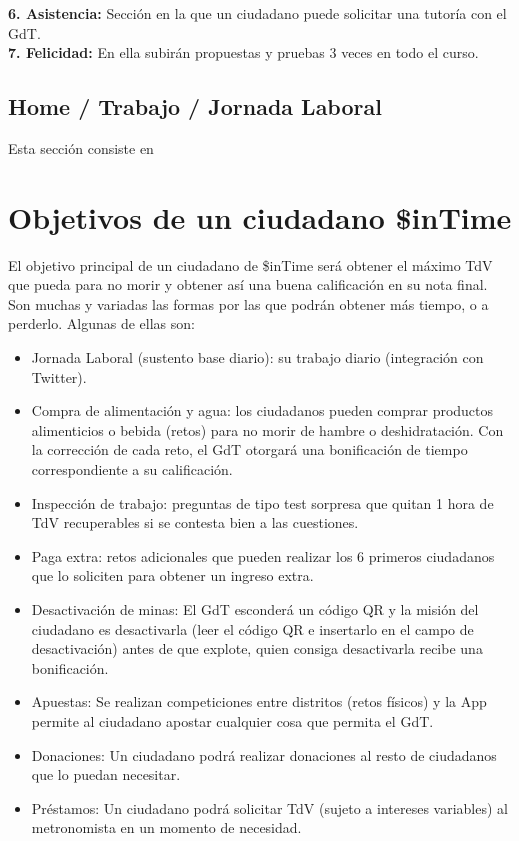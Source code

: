 \noindent
\textbf{6. Asistencia: } Sección en la que un ciudadano puede solicitar una tutoría con el GdT.\\

\noindent
\textbf{7. Felicidad: } En ella subirán propuestas y pruebas 3 veces en todo el curso.

\newpage

\subsection{Home / Trabajo / Jornada Laboral}

Esta sección consiste en 

\newpage
\section{Objetivos de un ciudadano \$inTime}

El objetivo principal de un ciudadano de \$inTime será obtener el máximo TdV que pueda para no morir y obtener así una buena calificación en su nota final. Son muchas y variadas las formas por las que podrán obtener más tiempo, o a perderlo. Algunas de ellas son:

\begin{itemize}
\item Jornada Laboral (sustento base diario): su trabajo diario (integración con Twitter).
\item Compra de alimentación y agua: los ciudadanos pueden comprar productos alimenticios o bebida (retos) para no morir de hambre o deshidratación. Con la corrección de cada reto, el GdT otorgará una bonificación de tiempo correspondiente a su calificación.
\item Inspección de trabajo: preguntas de tipo test sorpresa que quitan 1 hora de TdV recuperables si se contesta bien a las cuestiones.
\item Paga extra: retos adicionales que pueden realizar los 6 primeros ciudadanos que lo soliciten para obtener un ingreso extra.
\item Desactivación de minas: El GdT esconderá un código QR y la misión del ciudadano es desactivarla (leer el código QR e insertarlo en el campo de desactivación) antes de que explote, quien consiga desactivarla recibe una bonificación.
\item Apuestas: Se realizan competiciones entre distritos (retos físicos) y la App permite al ciudadano apostar cualquier cosa que permita el GdT.
\item Donaciones: Un ciudadano podrá realizar donaciones al resto de ciudadanos que lo puedan necesitar.
\item Préstamos: Un ciudadano podrá solicitar TdV (sujeto a intereses variables) al metronomista en un momento de necesidad.

\end{itemize} 

